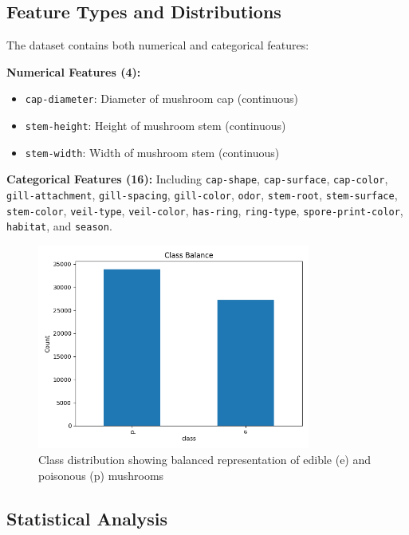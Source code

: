 \documentclass[11pt,a4paper]{article}
\begin{document}
\subsection{Feature Types and Distributions}

The dataset contains both numerical and categorical features:

\textbf{Numerical Features (4):}
\begin{itemize}
    \item \texttt{cap-diameter}: Diameter of mushroom cap (continuous)
    \item \texttt{stem-height}: Height of mushroom stem (continuous)  
    \item \texttt{stem-width}: Width of mushroom stem (continuous)
\end{itemize}

\textbf{Categorical Features (16):}
Including \texttt{cap-shape}, \texttt{cap-surface}, \texttt{cap-color}, \texttt{gill-attachment}, \texttt{gill-spacing}, \texttt{gill-color}, \texttt{odor}, \texttt{stem-root}, \texttt{stem-surface}, \texttt{stem-color}, \texttt{veil-type}, \texttt{veil-color}, \texttt{has-ring}, \texttt{ring-type}, \texttt{spore-print-color}, \texttt{habitat}, and \texttt{season}.

\begin{figure}[H]
    \centering
    \includegraphics[width=0.8\textwidth]{figures/eda_class_balance.png}
    \caption{Class distribution showing balanced representation of edible (e) and poisonous (p) mushrooms}
    \label{fig:class_balance}
\end{figure}

\subsection{Statistical Analysis}
\end{document}
